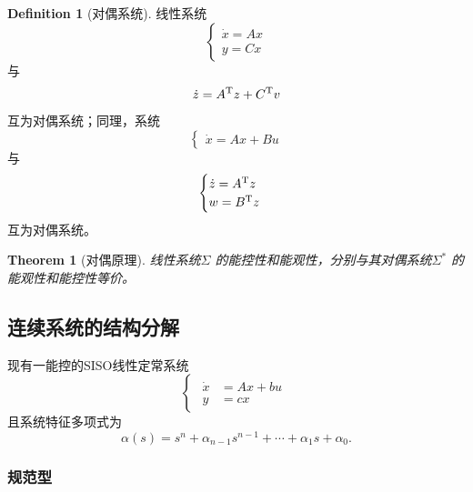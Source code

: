 \documentclass[14pt,a4paper]{article}
\theoremstyle{plain}
\newtheorem{thm}{Theorem}[section]
\theoremstyle{definition}
\newtheorem*{dfn}{Definition}
\theoremstyle{remark}
\theoremstyle{plain}
\theoremstyle{plain}
\theoremstyle{plain}
\theoremstyle{definition}
\theoremstyle{remark}
\numberwithin{equation}{section}
\begin{document}
				\begin{dfn}[对偶系统]  
				\label{dfn:对偶系统}
					线性系统
					\[
					\begin{cases}
						\dot x = Ax \\ 
						y = Cx
					\end{cases} 
					\] 
					与
					\[
					\dot z = A^{\textnormal{T}} z + C^{\textnormal{T}} v
					\]
					互为对偶系统；同理，系统
					\[
					\begin{cases}
						\dot x = Ax + Bu
					\end{cases} 
					\] 
					与
					\[
						\begin{cases}
							\dot z = A^{\textnormal{T}} z \\
							w = B^{\textnormal{T}} z
						\end{cases} 
					\]
					互为对偶系统。
				\end{dfn}  

				\begin{thm}[对偶原理]  
				\label{the:对偶原理}
					线性系统$\Sigma$ 的能控性和能观性，分别与其对偶系统$\Sigma^*$ 的能观性和能控性等价。
				\end{thm} 

		\subsection{连续系统的结构分解}%
		\label{sub:连续系统的结构分解}

			现有一能控的SISO线性定常系统
			\begin{equation}
			\label{eq:siso_lti}
				\begin{cases}
					\begin{aligned}
						\dot x &= Ax + bu \\ 
						y &= cx
					\end{aligned}  
				\end{cases} 
			\end{equation} 
			且系统特征多项式为
			\begin{equation}
			\label{eq:siso_lti_cp}
			\alpha(s) = s^{n} + \alpha_{n-1}s^{n-1}+ \cdots  + \alpha_1 s + \alpha_0	
			.\end{equation} 
		
			\subsubsection{规范型}%
			\label{ssub:规范型}
			
\end{document}
